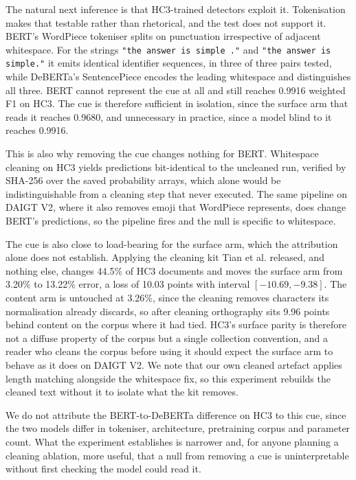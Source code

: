 The natural next inference is that HC3-trained detectors exploit it. Tokenisation makes that testable rather than rhetorical, and the test does not support it. BERT's WordPiece tokeniser splits on punctuation irrespective of adjacent whitespace. For the strings \texttt{"the answer is simple ."} and \texttt{"the answer is simple."} it emits identical identifier sequences, in three of three pairs tested, while DeBERTa's SentencePiece encodes the leading whitespace and distinguishes all three. BERT cannot represent the cue at all and still reaches 0.9916 weighted F1 on HC3. The cue is therefore sufficient in isolation, since the surface arm that reads it reaches 0.9680, and unnecessary in practice, since a model blind to it reaches 0.9916.

This is also why removing the cue changes nothing for BERT. Whitespace cleaning on HC3 yields predictions bit-identical to the uncleaned run, verified by SHA-256 over the saved probability arrays, which alone would be indistinguishable from a cleaning step that never executed. The same pipeline on DAIGT V2, where it also removes emoji that WordPiece represents, does change BERT's predictions, so the pipeline fires and the null is specific to whitespace.

The cue is also close to load-bearing for the surface arm, which the attribution alone does not establish. Applying the cleaning kit Tian et al. released, and nothing else, changes 44.5\% of HC3 documents and moves the surface arm from 3.20\% to 13.22\% error, a loss of 10.03 points with interval $[-10.69, -9.38]$. The content arm is untouched at 3.26\%, since the cleaning removes characters its normalisation already discards, so after cleaning orthography sits 9.96 points behind content on the corpus where it had tied. HC3's surface parity is therefore not a diffuse property of the corpus but a single collection convention, and a reader who cleans the corpus before using it should expect the surface arm to behave as it does on DAIGT V2. We note that our own cleaned artefact applies length matching alongside the whitespace fix, so this experiment rebuilds the cleaned text without it to isolate what the kit removes.

We do not attribute the BERT-to-DeBERTa difference on HC3 to this cue, since the two models differ in tokeniser, architecture, pretraining corpus and parameter count. What the experiment establishes is narrower and, for anyone planning a cleaning ablation, more useful, that a null from removing a cue is uninterpretable without first checking the model could read it.

